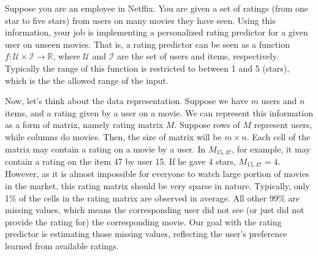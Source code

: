 \documentclass[twoside,10pt]{article}
\begin{document}
Suppose you are an employee in Netflix. You are given a set of
ratings (from one star to five stars) from users on many movies they
have seen. Using this information, your job is implementing a
personalized rating predictor for a given user on unseen movies.
That is, a rating predictor can be seen as a function $f:
\mathcal{U} \times \mathcal{I} \rightarrow \mathbb{R}$, where
$\mathcal{U}$ and $\mathcal{I}$ are the set of users and items,
respectively. Typically the range of this function is restricted to
between 1 and 5 (stars), which is the the allowed range of the
input.

Now, let's think about the data representation. Suppose we have $m$
users and $n$ items, and a rating given by a user on a movie. We can
represent this information as a form of matrix, namely rating matrix
$M$. Suppose rows of $M$ represent users, while columns do movies.
Then, the size of matrix will be $m \times n$. Each cell of the
matrix may contain a rating on a movie by a user. In $M_{15,47}$,
for example, it may contain a rating on the item 47 by user 15. If
he gave 4 stars, $M_{15,47} = 4$. However, as it is almost
impossible for everyone to watch large portion of movies in the
market, this rating matrix should be very sparse in nature.
Typically, only 1\% of the cells in the rating matrix are observed
in average. All other 99\% are missing values, which means the
corresponding user did not see (or just did not provide the rating
for) the corresponding movie. Our goal with the rating predictor is
estimating those missing values, reflecting the user's preference
learned from available ratings.
\end{document}
